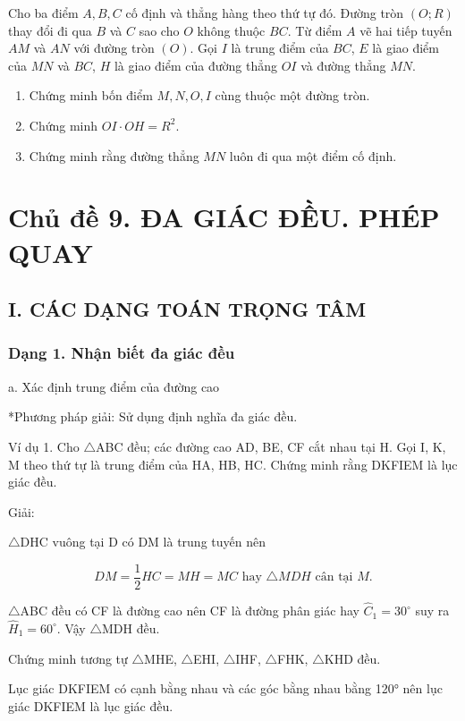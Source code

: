 \documentclass[%
    fontsize=12pt,%
    chapterprefix=false,%
    open=right,%
    twoside=false,%
    numbers=noenddot,%
    headings=optiontohead,%
    final,%
    DIV=15,%
    parskip=half %
]{scrbook}
\begin{document}
\begin{tuluan}
\item Cho ba điểm $A, B, C$ cố định và thẳng hàng theo thứ tự đó. Đường tròn $(O; R)$ thay đổi đi qua $B$ và $C$ sao cho $O$ không thuộc $BC$. Từ điểm $A$ vẽ hai tiếp tuyến $AM$ và $AN$ với đường tròn $(O)$. Gọi $I$ là trung điểm của $BC$, $E$ là giao điểm của $MN$ và $BC$, $H$ là giao điểm của đường thẳng $OI$ và đường thẳng $MN$.
\begin{enumerate}[label=\alph*)]
  \item[a)] Chứng minh bốn điểm $M, N, O, I$ cùng thuộc một đường tròn.
  \item[b)] Chứng minh $OI \cdot OH = R^2$.
  \item[c)] Chứng minh rằng đường thẳng $MN$ luôn đi qua một điểm cố định.
\end{enumerate}

\end{tuluan}

\section{Chủ đề 9. ĐA GIÁC ĐỀU. PHÉP QUAY}
\subsection{I. CÁC DẠNG TOÁN TRỌNG TÂM}
\subsubsection{Dạng 1. Nhận biết đa giác đều}

a. Xác định trung điểm của đường cao

*Phương pháp giải: Sử dụng định nghĩa đa giác đều.

Ví dụ 1. Cho $\triangle$ABC đều; các đường cao AD, BE, CF cắt nhau tại H. Gọi I, K, M theo thứ tự là trung điểm của HA, HB, HC. Chứng minh rằng DKFIEM là lục giác đều.

Giải:

$\triangle$DHC vuông tại D có DM là trung tuyến nên

\[ DM = \frac{1}{2}HC = MH = MC \text{ hay } \triangle MDH \text{ cân tại } M. \]

$\triangle$ABC đều có CF là đường cao nên CF là đường phân giác hay $ \widehat{C}_1 = 30^\circ $ suy ra $ \widehat{H}_1 = 60^\circ $. Vậy $\triangle$MDH đều.

Chứng minh tương tự $\triangle$MHE, $\triangle$EHI, $\triangle$IHF, $\triangle$FHK, $\triangle$KHD đều.

Lục giác DKFIEM có cạnh bằng nhau và các góc bằng nhau bằng 120° nên lục giác DKFIEM là lục giác đều.
\end{document}
